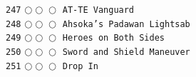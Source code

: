 \documentclass[a4paper,landscape]{article}
\begin{document}
\begin{multicols*}{5}
\texttt{247} \(\bigcirc\!\bigcirc\!\bigcirc\)  \texttt{AT-TE Vanguard} \vspace{-0.3mm}\\ 
\texttt{248} \(\bigcirc\!\bigcirc\!\bigcirc\)  \texttt{Ahsoka's Padawan Lightsab} \vspace{-0.3mm}\\ 
\texttt{249} \(\bigcirc\!\bigcirc\!\bigcirc\)  \texttt{Heroes on Both Sides} \vspace{-0.3mm}\\ 
\texttt{250} \(\bigcirc\!\bigcirc\!\bigcirc\)  \texttt{Sword and Shield Maneuver} \vspace{-0.3mm}\\ 
\texttt{251} \(\bigcirc\!\bigcirc\!\bigcirc\)  \texttt{Drop In} \vspace{-0.3mm}\\ 

\end{multicols*}
\end{document}
